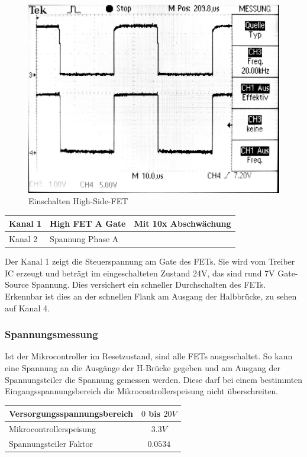 \begin{figure} [H]
	\centering
	\includegraphics[width=0.5\linewidth]{images/valmcfet.jpg}
	\caption{Einschalten High-Side-FET}
	\label{fig:hsfet}
\end{figure}
\begin{center}
	\begin{tabular}{l|l|l}
		\hline 
		Kanal 1 & High FET A Gate & Mit 10x Abschwächung\\ \hline
		Kanal 2 & Spannung Phase A & {}\\ \hline
	\end{tabular}
\end{center}

Der Kanal 1 zeigt die Steuerspannung am Gate des FETs. Sie wird vom Treiber IC erzeugt und beträgt im eingeschalteten Zustand 24V, das sind rund 7V Gate-Source Spannung. Dies versichert ein schneller Durchschalten des FETs. Erkennbar ist dies an der schnellen Flank am Ausgang der Halbbrücke, zu sehen auf Kanal 4.

\subsubsection*{Spannungsmessung}
Ist der Mikrocontroller im Resetzustand, sind alle FETs ausgeschaltet. So kann eine Spannung an die Ausgänge der H-Brücke gegeben und am Ausgang der Spannungsteiler die Spannung gemessen werden. Diese darf bei einem bestimmten Eingangsspannungsbereich die Mikrocontrollerspeisung nicht überschreiten.

\begin{center}
	\begin{tabular}{l|c}
		\hline 
		Versorgungsspannungsbereich & $0$ bis $20V$ \\ \hline
		Mikrocontrollerspeisung & $3.3V$ \\ \hline
		Spannungsteiler Faktor & $0.0534$ \\ \hline
	\end{tabular} 
	\label{tab:vmessbed}
\end{center}


